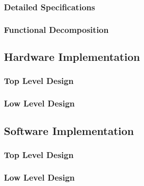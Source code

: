 \documentclass[12pt]{article} %
\begin{document}
\subsubsection{Detailed Specifications\label{detailedSpec}}

\subsubsection{Functional Decomposition\label{functions}}

\subsection{Hardware Implementation\label{hwImplementation}}

\subsubsection{Top Level Design\label{hwTopLevel}}

\subsubsection{Low Level Design\label{hwLowLevel}}

\subsection{Software Implementation\label{swImplementation}}
%
%

\subsubsection{Top Level Design\label{swTopLevel}}
%

\subsubsection{Low Level Design\label{swLowLevel}}
%
\end{document}
